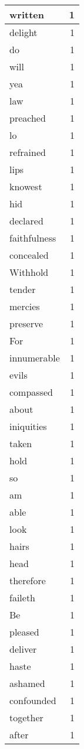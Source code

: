 \begin{center}
\begin{longtable}{l|r}
written & 1 \\ \hline
delight & 1 \\ \hline
do & 1 \\ \hline
will & 1 \\ \hline
yea & 1 \\ \hline
law & 1 \\ \hline
preached & 1 \\ \hline
lo & 1 \\ \hline
refrained & 1 \\ \hline
lips & 1 \\ \hline
knowest & 1 \\ \hline
hid & 1 \\ \hline
declared & 1 \\ \hline
faithfulness & 1 \\ \hline
concealed & 1 \\ \hline
Withhold & 1 \\ \hline
tender & 1 \\ \hline
mercies & 1 \\ \hline
preserve & 1 \\ \hline
For & 1 \\ \hline
innumerable & 1 \\ \hline
evils & 1 \\ \hline
compassed & 1 \\ \hline
about & 1 \\ \hline
iniquities & 1 \\ \hline
taken & 1 \\ \hline
hold & 1 \\ \hline
so & 1 \\ \hline
am & 1 \\ \hline
able & 1 \\ \hline
look & 1 \\ \hline
hairs & 1 \\ \hline
head & 1 \\ \hline
therefore & 1 \\ \hline
faileth & 1 \\ \hline
Be & 1 \\ \hline
pleased & 1 \\ \hline
deliver & 1 \\ \hline
haste & 1 \\ \hline
ashamed & 1 \\ \hline
confounded & 1 \\ \hline
together & 1 \\ \hline
after & 1 \\ \hline

\end{longtable}
\end{center}
